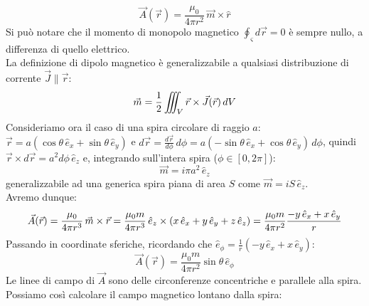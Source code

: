 \begin{equation}
	\vec{A}(\vec{r}) = \displaystyle\frac{\mu_0}{4\pi r^2} \, \vec{m}\times\hat{r}
	\label{eq:pot-dip}
\end{equation}
Si può notare che il momento di monopolo magnetico $ \oint_{\varsigma} d\vec{r} = 0  $ è sempre nullo, a differenza di quello elettrico. \\ 
%
La definizione di dipolo magnetico è generalizzabile a qualsiasi distribuzione di corrente $ \vec{J} \parallel \vec{r} $:
\begin{equation}
	\vec{m} = \frac{1}{2} \iiint_V \vec{r}\times\vec{J}(\vec{r}) \, dV
	\label{eq:dip-mag-def}
\end{equation}
%
Consideriamo ora il caso di una spira circolare di raggio $ a $: $ \vec{r} = a (\cos\theta\,\hat{e}_x + \sin\theta\,\hat{e}_y) $ e $ d\vec{r} = \frac{d\vec{r}}{d\phi} \,d\phi = a (-\sin\theta\,\hat{e}_x + \cos\theta\,\hat{e}_y) \,d\phi $, quindi $ \vec{r}\times d\vec{r} = a^2 d\phi \, \hat{e}_z $ e, integrando sull'intera spira ($ \phi\in[0,2\pi] $):
\begin{equation}
	\vec{m} = i \pi a^2 \, \hat{e}_z
	\label{eq:mom-sp-circ}
\end{equation}
generalizzabile ad una generica spira piana di area $ S $ come $ \vec{m} = i S \,\hat{e}_z $. \\ 
%
Avremo dunque:
\begin{equation}
	\vec{A}(\vec{r}) = \displaystyle\frac{\mu_0}{4\pi r^3} \, \vec{m}\times\vec{r} = \displaystyle\frac{\mu_0 m}{4\pi r^3} \, \hat{e}_z \times\left(x\,\hat{e}_x + y\,\hat{e}_y + z\,\hat{e}_z\right) = \displaystyle\frac{\mu_0 m}{4\pi r^2} \displaystyle\frac{-y \, \hat{e}_x + x \, \hat{e}_y}{r}
	\label{eq:calc-po-sp-circ}
\end{equation}
Passando in coordinate sferiche, ricordando che $ \hat{e}_{\phi} = \frac{1}{r} (-y \, \hat{e}_x + x \, \hat{e}_y) $:
\begin{equation}
	\vec{A}(\vec{r}) = \displaystyle\frac{\mu_0 m}{4\pi r^2} \sin\theta \,\hat{e}_{\phi}
	\label{eq:po-sp-circ}
\end{equation}
Le linee di campo di $ \vec{A} $ sono delle circonferenze concentriche e parallele alla spira. \\ 
%
Possiamo così calcolare il campo magnetico lontano dalla spira:
